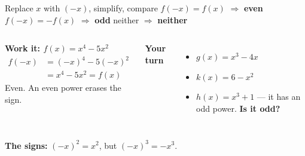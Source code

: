 \documentclass[aspectratio=169, 11pt]{beamer}
\begin{document}
\begin{frame}[t, plain]

  \begin{block}{Replace \(x\) with \((-x)\), simplify, compare}
    \(f(-x) = f(x)\) \(\Rightarrow\) \textbf{even} \qquad
    \(f(-x) = -f(x)\) \(\Rightarrow\) \textbf{odd} \qquad
    neither \(\Rightarrow\) \textbf{neither}
  \end{block}

  \medskip
  \begin{columns}[T]
      \textbf{Work it: \(f(x) = x^4 - 5x^2\)}
      \begin{align*}
        f(-x) &= (-x)^4 - 5(-x)^2 \\
              &= x^4 - 5x^2 = f(x)
      \end{align*}
      Even. An even power erases the sign.

      \textbf{Your turn}
      \begin{itemize}\setlength{\itemsep}{5pt}
        \item \(g(x) = x^3 - 4x\)
        \item \(k(x) = 6 - x^2\)
        \item \(h(x) = x^3 + 1\) --- it has an odd power. \textbf{Is it odd?}
      \end{itemize}
  \end{columns}

  \bigskip
  \textbf{The signs:} \((-x)^2 = x^2\), but \((-x)^3 = -x^3\).
\end{frame}
\end{document}
